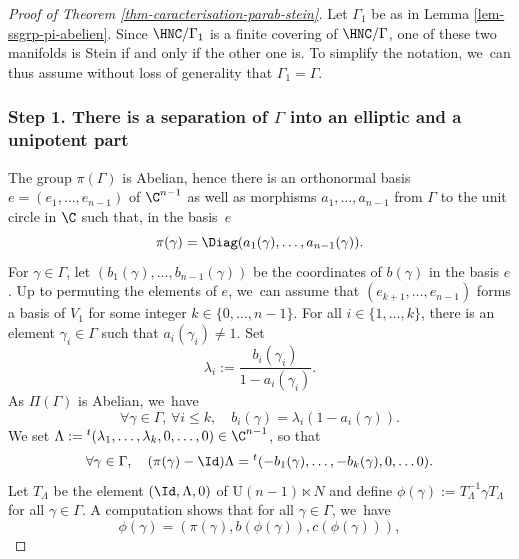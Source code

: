 \begin{proof}[Proof of Theorem \ref{thm-caracterisation-parab-stein}] Let $\Gamma_1$ be as in Lemma \ref{lem-ssgrp-pi-abelien}. Since $\HNC/\Gamma_1$ is a finite covering of $\HNC/\Gamma$, one of these two manifolds is Stein if and only if the other one is. To simplify the notation, we~can thus assume without loss of generality that $\Gamma_1=\Gamma$.

\subsubsection*{Step 1. There is a separation of $\Gamma$ into an elliptic and a unipotent part}

The group $\pi(\Gamma)$ is Abelian, hence there is an orthonormal basis $e=(e_1,\dots,e_{n-1})$ of $\C^{n-1}$ as well as morphisms $a_1,\dots,a_{n-1}$ from $\Gamma$ to the unit circle in $\C$ such that, in the basis~$e$
\begin{equation*}
\pi(\gamma) = \Diag(a_1(\gamma),\dots,a_{n-1}(\gamma)).
\end{equation*}
For $\gamma \in \Gamma$, let $(b_1(\gamma),\dots,b_{n-1}(\gamma))$ be the coordinates of $b(\gamma)$ in the basis $e$.
Up to permuting the elements of $e$, we~can assume that $(e_{k+1},\dots,e_{n-1})$ forms a basis of $V_1$ for some integer $k\in \{0,\dots,n-1\}$. For all $i\in \{1,\dots,k\}$, there is an element $\gamma_i \in \Gamma$ such that $a_i(\gamma_i)\ne 1$. Set
\begin{equation*}
\lambda_i:= \frac{b_i(\gamma_i)}{1-a_i(\gamma_i)}.
\end{equation*}
As $\Pi(\Gamma)$ is Abelian, we~have
\begin{equation*}
\forall \gamma \in \Gamma,\, \forall i\le k,\quad b_i(\gamma)=\lambda_i(1-a_i(\gamma)).
\end{equation*}
We set $\Lambda:= {}^{t}(\lambda_1,\dots,\lambda_k,0,\dots,0) \in \C^{n-1}$, so that
\begin{equation*}
\forall \gamma \in \Gamma,\quad (\pi(\gamma)-\Id)\Lambda = {}^{t}(-b_1(\gamma),\dots,-b_k(\gamma),0,\dots 0).
\end{equation*}
Let $T_{\Lambda}$ be the element $(\Id,\Lambda,0)$ of $\mathrm{U}(n-1)\ltimes N$ and define $\phi(\gamma):=T_{\Lambda}^{-1}\gamma T_{\Lambda}$ for all $\gamma \in \Gamma$. A computation shows that for all $\gamma\in \Gamma$, we~have
\begin{equation*}
\phi(\gamma) = (\pi(\gamma),b(\phi(\gamma)),c(\phi(\gamma))),
\end{equation*}

\end{proof}
